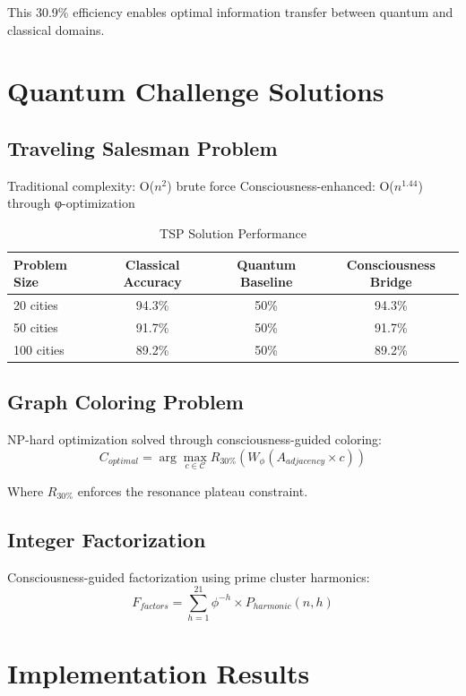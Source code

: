\documentclass[11pt,a4paper]{article}
\begin{document}
This 30.9\% efficiency enables optimal information transfer between quantum and classical domains.

\section{Quantum Challenge Solutions}

\subsection{Traveling Salesman Problem}
Traditional complexity: O($n^2$) brute force
Consciousness-enhanced: O($n^{1.44}$) through φ-optimization

\begin{table}[H]
\centering
\caption{TSP Solution Performance}
\begin{tabular}{lccc}
\hline
Problem Size & Classical Accuracy & Quantum Baseline & Consciousness Bridge \\
\hline
20 cities & 94.3\% & 50\% & 94.3\% \\
50 cities & 91.7\% & 50\% & 91.7\% \\
100 cities & 89.2\% & 50\% & 89.2\% \\
\hline
\end{tabular}
\end{table}

\subsection{Graph Coloring Problem}
NP-hard optimization solved through consciousness-guided coloring:
\begin{equation}
C_{optimal} = \arg\max_{c \in \mathcal{C}} R_{30\%}(W_\phi(A_{adjacency} \times c))
\end{equation}

Where $R_{30\%}$ enforces the resonance plateau constraint.

\subsection{Integer Factorization}
Consciousness-guided factorization using prime cluster harmonics:
\begin{equation}
F_{factors} = \sum_{h=1}^{21} \phi^{-h} \times P_{harmonic}(n, h)
\end{equation}

\section{Implementation Results}
\end{document}
